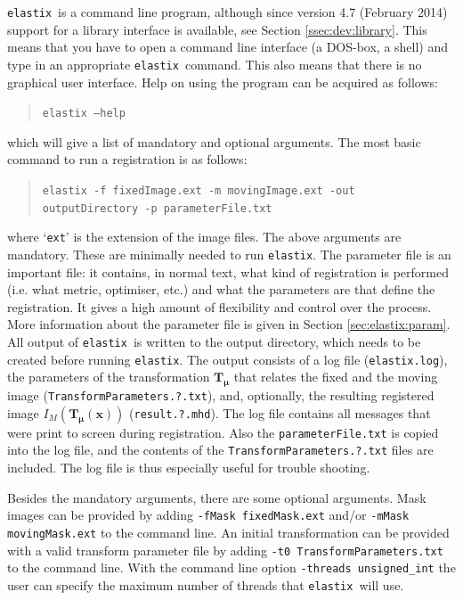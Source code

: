 \documentclass[]{report}
\newcommand{\elastix}{\texttt{elastix}}
\newcommand{\vmu}{\bm{\mu}}
\newcommand{\vT}{\bm{T}}
\newcommand{\vTmx}{\bm{T}_{\vmu}(\bm{x})}
\begin{document}
\elastix\ is a command line program, although since version 4.7
(February 2014) support for a library interface is available, see
Section \ref{ssec:dev:library}. This means that you have to open a
command line interface (a DOS-box, a shell) and type in an
appropriate \elastix\ command. This also means that there is no
graphical user interface. Help on using the program can be acquired
as follows:
\begin{quote}
\texttt{elastix --help}
\end{quote}
which will give a list of mandatory and optional arguments. The most
basic command to run a registration is as follows:
\begin{quote}
\texttt{elastix -f fixedImage.ext -m movingImage.ext -out
outputDirectory -p parameterFile.txt}
\end{quote}
where `\texttt{ext}' is the extension of the image files. The above
arguments are mandatory. These are minimally needed to run \elastix.
The parameter file is an important file: it contains, in normal
text, what kind of registration is performed (i.e. what metric,
optimiser, etc.) and what the parameters are that define the
registration. It gives a high amount of flexibility and control over
the process. More information about the parameter file is given in
Section \ref{sec:elastix:param}. All output of \elastix\ is written
to the output directory, which needs to be created before running
\elastix. The output consists of a log file (\texttt{elastix.log}),
the parameters of the transformation $\vT_{\vmu}$ that relates the
fixed and the moving image (\texttt{TransformParameters.?.txt}),
and, optionally, the resulting registered image $I_M(\vTmx)$
(\texttt{result.?.mhd}). The log file contains all messages that
were print to screen during registration. Also the
\texttt{parameterFile.txt} is copied into the log file, and the
contents of the \texttt{TransformParameters.?.txt} files are
included. The log file is thus especially useful for trouble
shooting.

Besides the mandatory arguments, there are some optional
arguments. Mask images can be provided by adding \texttt{-fMask
fixedMask.ext} and/or \texttt{-mMask movingMask.ext} to the
command line. An initial transformation can be provided with a
valid transform parameter file by adding \texttt{-t0
TransformParameters.txt} to the command line. With the command
line option \texttt{-threads unsigned\_int} the user can specify
the maximum number of threads that \elastix\ will use.
\end{document}
